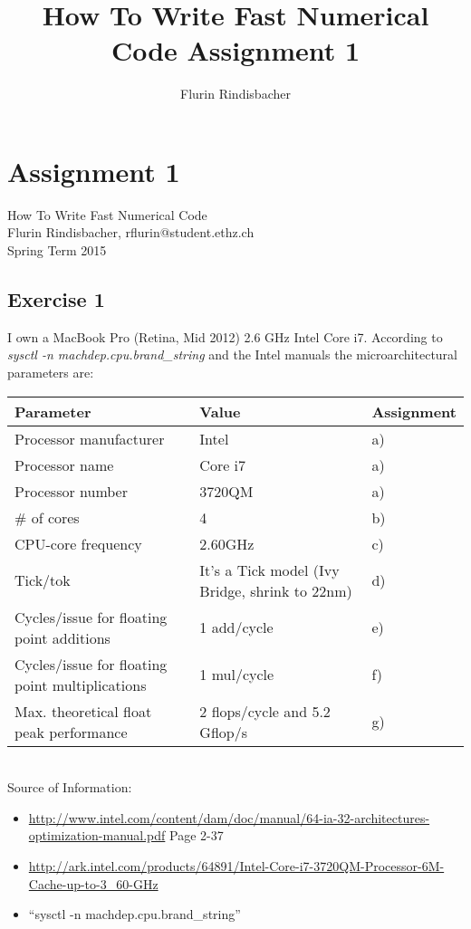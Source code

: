 \documentclass[10pt,a4paper,oneside]{report}
\author{Flurin Rindisbacher}
\title{How To Write Fast Numerical Code Assignment 1}
\begin{document}
\chapter*{Assignment 1}
How To Write Fast Numerical Code \\
Flurin Rindisbacher, rflurin@student.ethz.ch \\
Spring Term 2015
\section*{Exercise 1}
I own a MacBook Pro (Retina, Mid 2012) 2.6 GHz Intel Core i7. According to \textit{sysctl -n machdep.cpu.brand\_string} and the Intel manuals the microarchitectural parameters are: \\

\begin{tabular}{|l|l|l|}
\hline 
\rowcolor{gray!30}
\textbf{Parameter} & \textbf{Value} & \textbf{Assignment} \\ 
\hline 
Processor manufacturer & Intel & a)\\ 
\hline 
Processor name & Core i7 & a)\\ 
\hline
Processor number & 3720QM  & a)\\ 
\hline
\# of cores & 4  & b) \\ 
\hline 
CPU-core frequency & 2.60GHz  & c)\\ 
\hline 
Tick/tok & It's a Tick model (Ivy Bridge, shrink to 22nm) & d) \\ 
\hline 
Cycles/issue for floating point additions & 1 add/cycle & e) \\ 
\hline 
Cycles/issue for floating point multiplications & 1 mul/cycle & f) \\ 
\hline 
Max. theoretical float peak performance & 2 flops/cycle and 5.2 Gflop/s & g) \\ 
\hline 
\end{tabular} 
\\
Source of Information:
\begin{itemize}
  \item \url{http://www.intel.com/content/dam/doc/manual/64-ia-32-architectures-optimization-manual.pdf} Page 2-37
  \item \url{http://ark.intel.com/products/64891/Intel-Core-i7-3720QM-Processor-6M-Cache-up-to-3_60-GHz}
  \item ``sysctl -n machdep.cpu.brand\_string''
\end{itemize}
\end{document}
